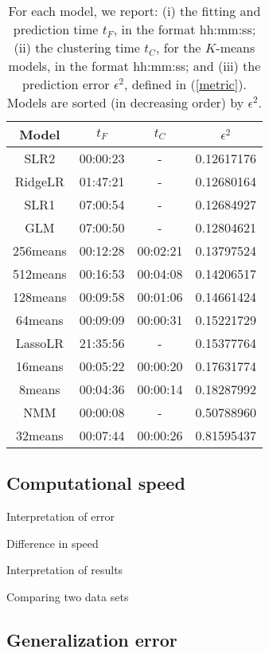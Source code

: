 \documentclass{article} %
\begin{document}
\begin{table}[htbp]
\small
   \centering
   \begin{tabular}{@{}|c|c|c|c|@{}} %
  \cline{1-4}
Model & $t_F$ & $t_C$ & $\epsilon^2$ \\ \hline
\hline
SLR2 & 00:00:23 & - & 0.12617176 \\ \hline
RidgeLR & 01:47:21 & - & 0.12680164 \\ \hline
SLR1 & 07:00:54 & - & 0.12684927 \\ \hline
GLM & 07:00:50 & - & 0.12804621 \\ \hline
256means & 00:12:28 & 00:02:21 & 0.13797524 \\ \hline
512means & 00:16:53 & 00:04:08 & 0.14206517 \\ \hline
128means & 00:09:58 & 00:01:06 & 0.14661424 \\ \hline
64means & 00:09:09 & 00:00:31 & 0.15221729 \\ \hline
LassoLR & 21:35:56 & - & 0.15377764 \\ \hline
16means & 00:05:22 & 00:00:20 & 0.17631774 \\ \hline
8means & 00:04:36 & 00:00:14 & 0.18287992 \\ \hline
NMM & 00:00:08 & - & 0.50788960 \\ \hline
32means & 00:07:44 & 00:00:26 & 0.81595437 \\ \hline
   \end{tabular}
   \caption{For each model, we report: (i) the fitting and prediction time $t_F$, in the format hh:mm:ss; (ii) the clustering time $t_C$, for the $K$-means models, in the format hh:mm:ss; and (iii) the prediction error $\epsilon^2$, defined in (\ref{metric}). Models are sorted (in decreasing order) by $\epsilon^2$.}
   \label{tab:models}
\end{table}



\subsection{Computational speed}

Interpretation of error

Difference in speed

Interpretation of results

Comparing two data sets

\subsection{Generalization error}
\end{document}
